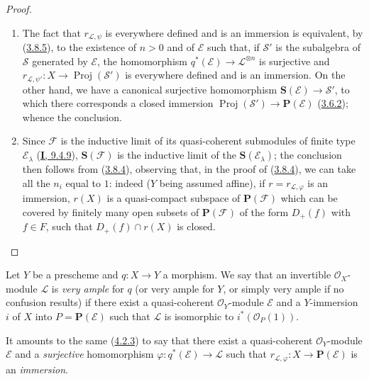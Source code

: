 \begin{proof}
\begin{enumerate}
  \item[\rm{(i)}] The fact that $r_{\mathcal{L},\psi}$ is everywhere defined
  and is an immersion is equivalent, by
  (\hyperref[II.3.8.5]{3.8.5}), to the existence of $n>0$ and of
  $\mathcal{E}$ such that, if $\mathcal{S}'$ is the subalgebra of
  $\mathcal{S}$ generated by $\mathcal{E}$, the homomorphism
  $q^*(\mathcal{E})\to\mathcal{L}^{\otimes n}$ is surjective and
  $r_{\mathcal{L},\psi'}:X\to\operatorname{Proj}(\mathcal{S}')$ is everywhere
  defined and is an immersion. On the other hand, we have a canonical
  surjective homomorphism $\mathbf{S}(\mathcal{E})\to\mathcal{S}'$, to which
  there corresponds a closed immersion
  $\operatorname{Proj}(\mathcal{S}')\to\mathbf{P}(\mathcal{E})$
  (\hyperref[II.3.6.2]{3.6.2}); whence the conclusion.
  \item[\rm{(ii)}] Since $\mathcal{F}$ is the inductive limit of its
  quasi-coherent submodules of finite type $\mathcal{E}_\lambda$
  (\hyperref[I.9.4.9]{\textbf{I}, 9.4.9}), $\mathbf{S}(\mathcal{F})$ is the inductive
  limit of the $\mathbf{S}(\mathcal{E}_\lambda)$; the conclusion then follows
  from (\hyperref[II.3.8.4]{3.8.4}), observing that, in the
  proof of (\hyperref[II.3.8.4]{3.8.4}), we can take all the
  $n_i$ equal to $1$: indeed ($Y$ being assumed affine), if
  $r=r_{\mathcal{L},\varphi}$ is an immersion, $r(X)$ is a quasi-compact
  subspace of $\mathbf{P}(\mathcal{F})$ which can be covered by finitely
  many open subsets of $\mathbf{P}(\mathcal{F})$ of the form $D_+(f)$ with
  $f\in F$, such that $D_+(f)\cap r(X)$ is closed.
\end{enumerate}
\end{proof}

\begin{definition}[4.4.2]
\label{II.4.4.2}
Let $Y$ be a prescheme and $q:X\to Y$ a morphism. We say that an invertible
$\mathcal{O}_X$-module $\mathcal{L}$ is \emph{very ample} for
$q$ \textup{(or} very ample for $Y$\textup{, or simply} very ample \textup{if
no confusion results)} if there exist a quasi-coherent $\mathcal{O}_Y$-module
$\mathcal{E}$ and a $Y$-immersion $i$ of $X$ into
$P=\mathbf{P}(\mathcal{E})$ such that $\mathcal{L}$ is isomorphic to
$i^*(\mathcal{O}_P(1))$.
\end{definition}

It amounts to the same (\hyperref[II.4.2.3]{4.2.3}) to say that there exist a
quasi-coherent $\mathcal{O}_Y$-module $\mathcal{E}$ and a \emph{surjective}
homomorphism $\varphi:q^*(\mathcal{E})\to\mathcal{L}$ such that
$r_{\mathcal{L},\varphi}:X\to\mathbf{P}(\mathcal{E})$ is an \emph{immersion}.

